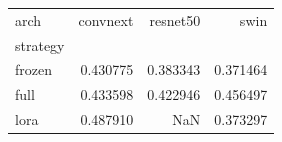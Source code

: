 \begin{tabular}{lrrr}
\toprule
arch & convnext & resnet50 & swin \\
strategy &  &  &  \\
\midrule
frozen & 0.430775 & 0.383343 & 0.371464 \\
full & 0.433598 & 0.422946 & 0.456497 \\
lora & 0.487910 & NaN & 0.373297 \\
\bottomrule
\end{tabular}
